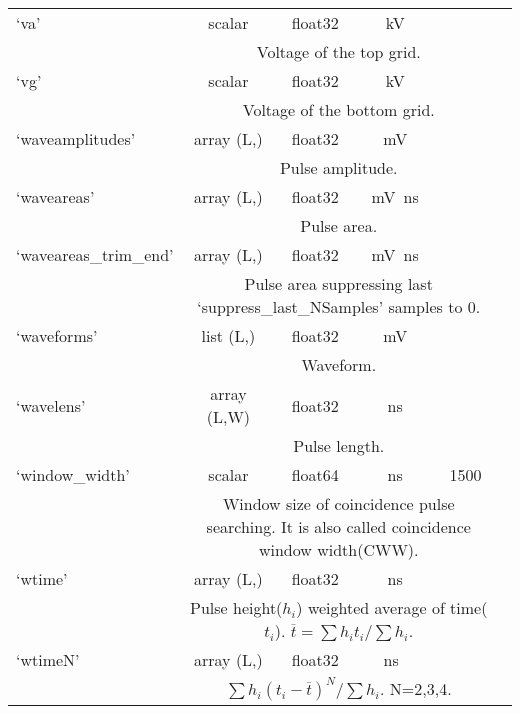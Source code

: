 \begin{center}
\begin{longtable}[!htbp]{|l||*{5}{c|}}
	 	`va' & scalar & float32 & \si{\kV} &  \\\cline{2-6} & \multicolumn{4}{m{27em}|}{Voltage of the top grid.}\\\hline
	 	`vg' & scalar & float32 & \si{\kV} &  \\\cline{2-6} & \multicolumn{4}{m{27em}|}{Voltage of the bottom grid.}\\\hline
	 	`waveamplitudes' & array (L,) & float32 & \si{\mV} &  \\\cline{2-6} & \multicolumn{4}{m{27em}|}{Pulse amplitude. }\\\hline
	 	`waveareas' & array (L,) & float32 & \si{\mV\ns}&  \\\cline{2-6} & \multicolumn{4}{m{27em}|}{Pulse area. }\\\hline
	 	`waveareas\_trim\_end' & array (L,) & float32 & \si{\mV\ns} & \si{\nan} \\\cline{2-6} & \multicolumn{4}{m{27em}|}{Pulse area suppressing last `suppress\_last\_NSamples' samples to 0. }\\\hline
	 	`waveforms' & list (L,) & float32 & \si{\mV} & \si{\nan} \\\cline{2-6} & \multicolumn{4}{m{27em}|}{Waveform.}\\\hline
	 	`wavelens' & array (L,W) & float32 & \si{\ns}&  \\\cline{2-6} & \multicolumn{4}{m{27em}|}{Pulse length. }\\\hline
	 	`window\_width' & scalar & float64 & \si{\ns} & 1500 \\\cline{2-6} & \multicolumn{4}{m{27em}|}{Window size of coincidence pulse searching. It is also called coincidence window width(CWW).}\\\hline
	 	`wtime' & array (L,) & float32 & \si{\ns} & \si{\nan} \\\cline{2-6} & \multicolumn{4}{m{27em}|}{Pulse height($h_i$) weighted average of time($t_i$). $\overline{t} = \sum h_i t_i /\sum h_i$. }\\\hline 
	 	`wtimeN' & array (L,) & float32 & \si{\ns\totheNth} & \si{\nan} \\\cline{2-6} & \multicolumn{4}{m{27em}|}{$\sum h_i (t_i-\overline{t})^{N} /\sum h_i$.  N=2,3,4.}\\\hline
		

\end{longtable}
\end{center}
